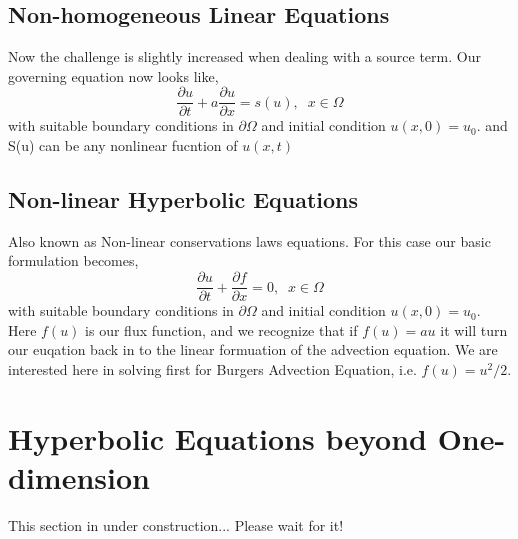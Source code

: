 \documentclass[11pt,fleqn]{report}
\begin{document}
\section{Non-homogeneous Linear Equations}
Now the challenge is slightly increased when dealing with a source term. Our governing equation now looks like,
\begin{equation}
	\frac{\partial u}{\partial t} + a \frac{\partial u}{\partial x} = s(u), \;\; x \in \Omega
	\label{nonhomo_advection}
\end{equation}
with suitable boundary conditions in $\partial \Omega$ and initial condition $u(x,0) = u_0$.
and S(u) can be any nonlinear fucntion of $u(x,t)$

\section{Non-linear Hyperbolic Equations}
Also known as Non-linear conservations laws equations. For this case our basic formulation becomes,
\begin{equation}
	\frac{\partial u}{\partial t} + \frac{\partial f}{\partial x} = 0, \;\; x \in \Omega
	\label{nonlinear_advection}
\end{equation}
with suitable boundary conditions in $\partial \Omega$ and initial condition $u(x,0) = u_0$. 
Here $f(u)$ is our flux function, and we recognize that if $f(u) = a u$ it will turn our euqation back in to the linear formuation of the advection equation. We are interested here in solving first for Burgers Advection Equation, i.e. $f(u) = u^2/2$.

\chapter{Hyperbolic Equations beyond One-dimension}
This section in under construction... Please wait for it!
\end{document}
